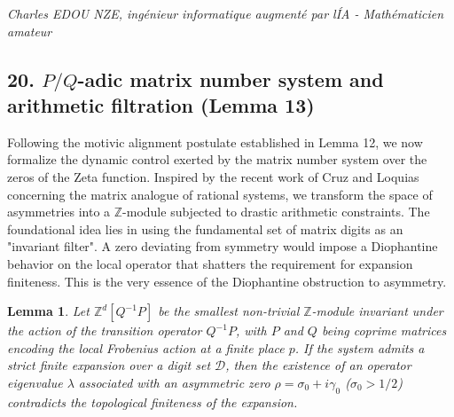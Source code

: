\documentclass[
]{article}
\newtheorem{lemma}{Lemma}
\begin{document}
\vspace{1cm}
\begin{flushright}
\textit{Charles EDOU NZE, ingénieur informatique augmenté par l\'IA - Mathématicien amateur}
\end{flushright}

\subsection{20. $P/Q$-adic matrix number system and arithmetic filtration (Lemma 13)}
Following the motivic alignment postulate established in Lemma 12, we now formalize the dynamic control exerted by the matrix number system over the zeros of the Zeta function. Inspired by the recent work of Cruz and Loquias concerning the matrix analogue of rational systems, we transform the space of asymmetries into a $\mathbb{Z}$-module subjected to drastic arithmetic constraints. The foundational idea lies in using the fundamental set of matrix digits as an "invariant filter". A zero deviating from symmetry would impose a Diophantine behavior on the local operator that shatters the requirement for expansion finiteness. This is the very essence of the Diophantine obstruction to asymmetry.

\begin{lemma}
Let $\mathbb{Z}^d[Q^{-1}P]$ be the smallest non-trivial $\mathbb{Z}$-module invariant under the action of the transition operator $Q^{-1}P$, with $P$ and $Q$ being coprime matrices encoding the local Frobenius action at a finite place $p$. If the system admits a strict finite expansion over a digit set $\mathcal{D}$, then the existence of an operator eigenvalue $\lambda$ associated with an asymmetric zero $\rho = \sigma_0 + i\gamma_0$ ($\sigma_0 > 1/2$) contradicts the topological finiteness of the expansion.
\end{lemma}
\end{document}
